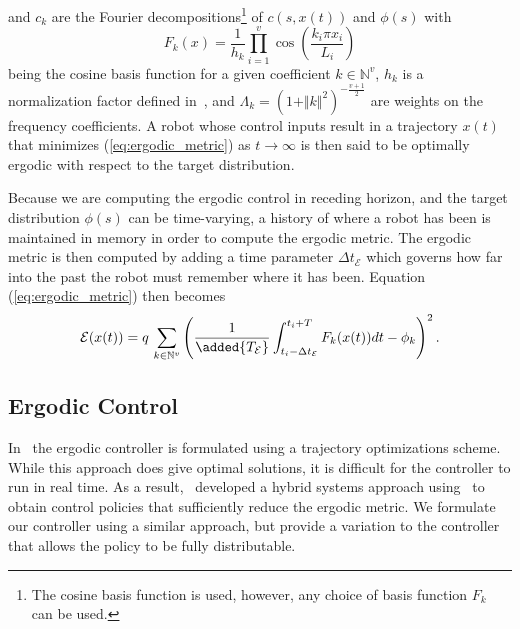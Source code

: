 \documentclass[letterpaper, 10 pt, conference]{ieeeconf}  %
\begin{document}
 and $c_k$ are the Fourier decompositions\footnote{The cosine basis function is used, however, any choice of basis function $F_k$ can be used.} of $c(s,x(t))$ and $\phi(s)$ with
\begin{equation*}
F_k(x) = \frac{1}{h_k}\prod_{i=1}^v \cos \left( \frac{k_i \pi x_i}{L_i} \right)
\end{equation*}
being the cosine basis function for a given coefficient $k \in \mathbb{N}^v$,  $h_k$ is a normalization factor defined in~\cite{mathew2011metrics}, and $\Lambda_k = (1 + \Vert k \Vert^2)^{-\frac{v+1}{2}}$ are weights on the frequency coefficients.
A robot whose control inputs result in a trajectory $x(t)$ that minimizes (\ref{eq:ergodic_metric}) as $t\to \infty$ is then said to be optimally ergodic with respect to the target distribution.

Because we are computing the ergodic control in receding horizon, and the target distribution $\phi(s)$ can be time-varying, a history of where a robot has been is maintained in memory in order to compute the ergodic metric.
The ergodic metric is then computed by adding a time parameter $\Delta t_\mathcal{E}$ which governs how far into the past the robot must remember where it has been. 
Equation (\ref{eq:ergodic_metric}) then becomes
\begin{equation}\label{eq:aug_ergodic_metric}
\mathcal{E}(x(t)) = q \, \sum_{k \in \mathbb{N}^v} \left( \frac{1}{\added{T_\mathcal{E}}} \int_{t_i-\Delta t_\mathcal{E} }^{t_i + T} F_k(x(t)) dt - \phi_k\right) ^2.
\end{equation}	
\subsection{Ergodic Control}
\label{subsec:ergodic-control}
In~\cite{miller2013trajectory} the ergodic controller is formulated using a trajectory optimizations scheme.
While this approach does give optimal solutions, it is difficult for the controller to run in real time. 
As a result,~\cite{mavrommatiTRO2017realTime} developed a hybrid systems approach using~\cite{ansari2016sequential} to obtain control policies that sufficiently reduce the ergodic metric.
We formulate our controller using a similar approach, but provide a variation to the controller that allows the policy to be fully distributable. 
	
\end{document}

